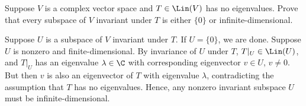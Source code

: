 \begin{exercise}
Suppose $V$ is a complex vector space and $T\in\Lin(V)$ has no eigenvalues.
Prove that every subspace of $V$ invariant under $T$ is either $\{0\}$ or
infinite-dimensional.
\end{exercise}
\begin{solution}
Suppose $U$ is a subspace of $V$ invariant under $T$. If $U=\{0\}$, we are
done. Suppose $U$ is nonzero and finite-dimensional. By invariance of $U$
under $T$, $T|_U\in\Lin(U)$, and $T|_U$ has an eigenvalue $\lambda\in\C$ with
corresponding eigenvector $v\in U$, $v\ne0$. But then $v$ is also an
eigenvector of $T$ with eigenvalue $\lambda$, contradicting the assumption
that $T$ has no eigenvalues. Hence, any nonzero invariant subspace $U$ must be
infinite-dimensional.
\end{solution}

